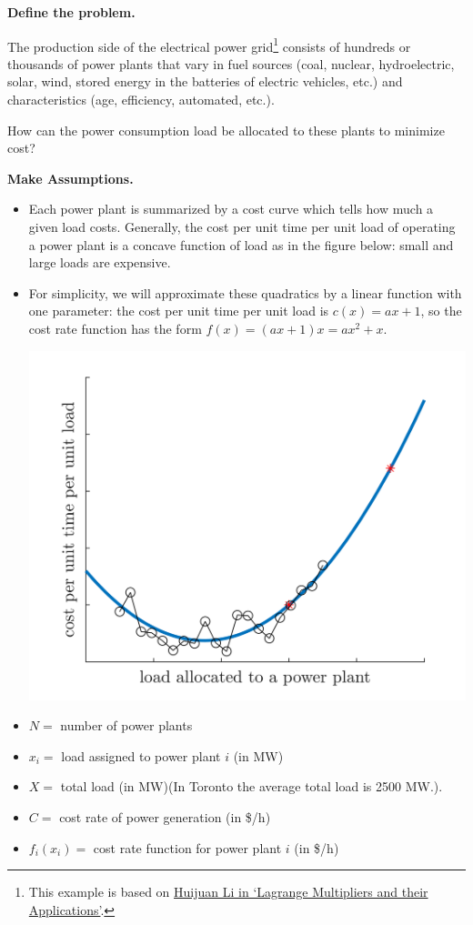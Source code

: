 \documentclass{workbook}
\begin{document}
\begin{slide}

\question

\textbf{Define the problem.}

\begin{problem}
The production side of the electrical power grid\footnote{This example is based on \href{https://sces.phys.utk.edu/~moreo/mm08/method_HLi.pdf}{Huijuan Li in `Lagrange Multipliers and their Applications'}.} consists of hundreds or thousands of power plants that vary in fuel sources (coal, nuclear, hydroelectric, solar, wind, stored energy in the batteries of electric vehicles, etc.) and characteristics (age, efficiency, automated, etc.). 

How can the power consumption load be allocated to these plants to minimize cost?
\end{problem}


\textbf{Make Assumptions.}

\begin{itemize}
	\item Each power plant is summarized by a cost curve which tells how much a given load costs. Generally, the cost per unit time per unit load of operating a power plant is a concave function of load as in the figure below: small and large loads are expensive.
	\item For simplicity, we will approximate these quadratics by a linear function with one parameter: the cost per unit time per unit load is $c(x) =ax+1$, so the cost rate function has the form $f(x)=(ax+1)x = ax^2+x$.
	
	\includegraphics[width=.4\textwidth]{images/concavecost.png} 
	
	\item $N=$ number of power plants
	\item $x_i=$ load assigned to power plant $i$ (in MW)
	\item $X=$ total load (in MW)({In Toronto the average total load is 2500 MW.}).
	\item $C=$ cost rate of power generation (in \$/h)
	\item $f_i(x_i)=$ cost rate function for power plant $i$ (in \$/h)
	

\end{itemize}

	
\end{slide}
\end{document}
